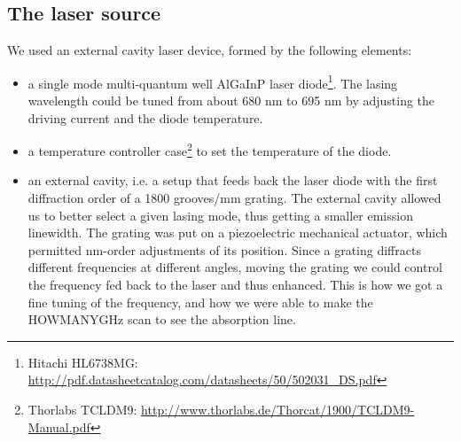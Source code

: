 \documentclass[a4paper, 11pt]{article}
\begin{document}
\subsection{The laser source}
We used an external cavity laser device, formed by the following elements:
\begin{itemize}
\item a single mode multi-quantum well AlGaInP laser diode\footnote{Hitachi HL6738MG: \url{http://pdf.datasheetcatalog.com/datasheets/50/502031_DS.pdf}}.
 The lasing wavelength could be tuned from about 680 nm to 695 nm by adjusting the driving current and the diode temperature.
\item a temperature controller case\footnote{Thorlabs TCLDM9: \url{http://www.thorlabs.de/Thorcat/1900/TCLDM9-Manual.pdf}} to set the temperature of the diode. 
\item an external cavity, i.e. a setup that feeds back the laser diode with the first diffraction order of a 1800 grooves/mm grating. The external cavity allowed us to better select a given lasing mode, thus getting a smaller emission linewidth. The grating was put on a piezoelectric mechanical actuator, which permitted nm-order adjustments of its position. Since a grating diffracts different frequencies at different angles, moving the grating we could control the frequency fed back to the laser and thus enhanced. This is how we got a fine tuning of the frequency, and how we were able to make the HOWMANYGHz scan to see the absorption line. 
\end{itemize} 
\end{document}
